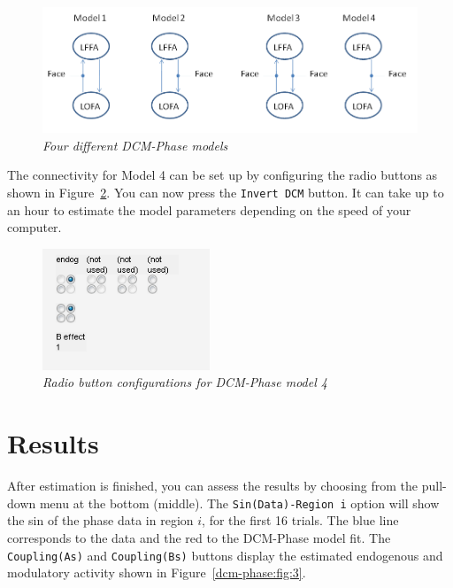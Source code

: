\begin{figure}
\begin{center}
\includegraphics[width=160mm]{dcm_phase/figures/phase_models}
\caption{\em Four different DCM-Phase models  \label{dcm-phase:fig:1}}
\end{center}
\end{figure}

The connectivity for Model 4 can be set up by configuring the radio buttons as shown in Figure~\ref{dcm-phase:fig:2}. You can now press the \texttt{Invert DCM} button. It can take up to an hour to estimate the model parameters depending on the speed of your computer.

\begin{figure}
\begin{center}
\includegraphics[width=50mm]{dcm_phase/figures/model4_conn}
\caption{\em Radio button configurations for DCM-Phase model 4  \label{dcm-phase:fig:2}}
\end{center}
\end{figure}

\section{Results}

After estimation is finished, you can assess the results by choosing from the pull-down menu at the bottom (middle). The \texttt{Sin(Data)-Region i} option will show the sin of the phase data in region $i$, for the first 16 trials. The blue line corresponds to the data and the red to the DCM-Phase model fit. The 
\texttt{Coupling(As)} and \texttt{Coupling(Bs)} buttons display the estimated endogenous and modulatory activity shown in Figure~\ref{dcm-phase:fig:3}.

